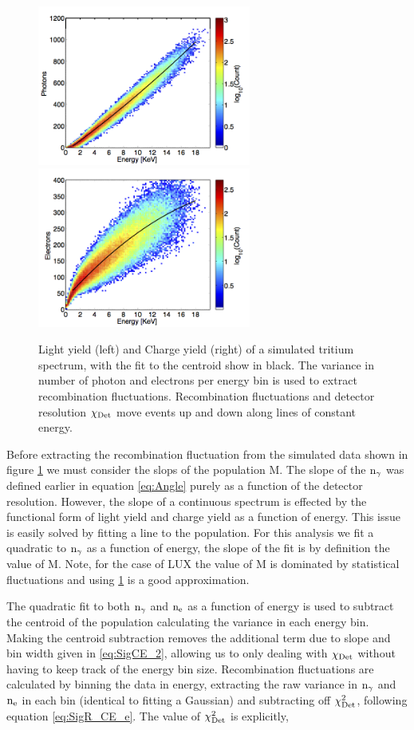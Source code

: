 \begin{figure}[h!]\centering
\includegraphics[width=70mm]{Chapter_Flucs/Figures/Ex_Plots/LY_T_SIM.png}
\includegraphics[width=70mm]{Chapter_Flucs/Figures/Ex_Plots/QY_T_SIM.png}
\caption{Light yield (left) and Charge yield (right) of a simulated tritium spectrum, with the fit to the centroid show in black. The variance in number of photon and electrons per energy bin is used to extract recombination fluctuations. Recombination fluctuations and detector resolution $\rm \chi_{Det}$ move events up and down along lines of constant energy.}
\label{fig:SIM_LYQY}
\end{figure}


\label{sec:Centroid}
Before extracting the recombination fluctuation from the simulated data shown in figure \ref{fig:SIM_LYQY} we must consider the slops of the population M. The slope of the $\rm n_\gamma$ was defined earlier in equation \ref{eq:Angle} purely as a function of the detector resolution. However, the slope of a continuous spectrum is effected by the functional form of light yield and charge yield as a function of energy.  This issue is easily solved by fitting a line to the population. For this analysis we fit a quadratic to $\rm n_\gamma$ as a function of energy, the slope of the fit is by definition the value of M. Note, for the case of LUX the value of M is dominated by statistical fluctuations and using \ref{fig:SIM_LYQY} is a good approximation.

The quadratic fit to both $\rm n_\gamma$ and $\rm n_e$ as a function of energy is used to subtract the centroid of the population calculating the variance in each energy bin. Making the centroid subtraction removes the additional term due to slope and bin width given in \ref{eq:SigCE_2}, allowing us to only dealing with $\rm \chi_{Det}$ without having to keep track of the energy bin size. Recombination fluctuations are calculated by binning the data in energy, extracting the raw variance in $\rm n_\gamma$ and $\rm n_e$ in each bin (identical to fitting a Gaussian) and subtracting off $\rm \chi_{Det}^2$, following equation \ref{eq:SigR_CE_e}. The value of  $\rm \chi_{Det}^2$ is explicitly, 

